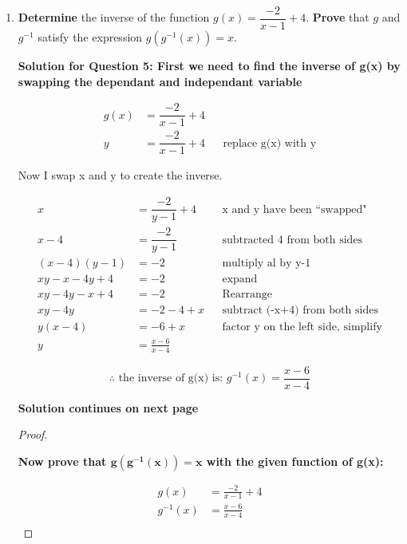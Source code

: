 \documentclass[12pt]{book}
\begin{document}
\begin{enumerate}
\newpage

\item \textbf{Determine} the inverse of the function $g(x)=\dfrac{-2}{x-1}+4$. \textbf{Prove} that $g$ and $g^{-1}$ satisfy the expression $g(g^{-1}(x))=x$.

\vspace{1em}
\textbf{Solution for Question 5: First we need to find the inverse of g(x) by swapping the dependant and independant variable}

\begin{align*}
    g(x) &=\dfrac{-2}{x-1}+4 \\
    y &=\dfrac{-2}{x-1}+4 && \text{replace g(x) with y}
\end{align*}

\begin{center}
    Now I swap x and y to create the inverse.
\end{center}

\begin{align*}
    x &=\dfrac{-2}{y-1}+4 && \text{x and y have been ``swapped"} \\
    x-4 &=\dfrac{-2}{y-1} && \text{subtracted 4 from both sides} \\
    (x-4)(y-1) &= -2 && \text{multiply al by y-1} \\
    xy-x-4y+4 &= -2 && \text{expand} \\
    xy-4y-x+4 &= -2 && \text{Rearrange}\\
    xy-4y &= -2-4+x && \text{subtract (-x+4) from both sides} \\
    y(x-4) &= -6+x && \text{factor y on the left side, simplify} \\
    y &= \frac{x-6}{x-4}
\end{align*}

$$\therefore \text{ the inverse of g(x) is: } \boxed{g^{-1}(x) = \frac{x-6}{x-4}} $$

\vspace{3em}
\begin{center}
    \textbf{Solution continues on next page}
\end{center}

\newpage
\begin{proof}
    \begin{center}
        \textbf{Now prove that $\boldsymbol{g(g^{-1}(x)) = x}$ with the given function of g(x):}
    \end{center}

    \begin{align*}
        g(x) &= \frac{-2}{x-1}+4\\
        g^{-1}(x) &= \frac{x-6}{x-4} \\
    \end{align*}
    \vspace{-5em}


\end{proof}
\end{enumerate}
\end{document}

